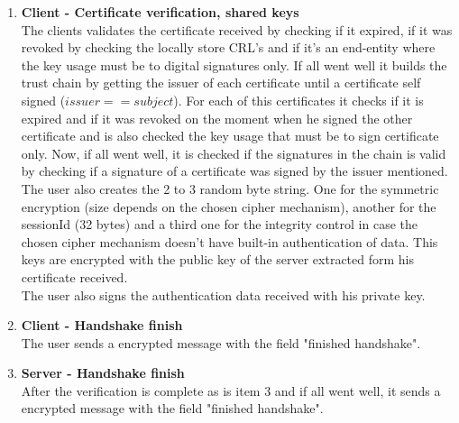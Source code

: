 \documentclass[12pt]{article}
\begin{document}
\begin{enumerate}[label=\textbf{\arabic*}]
  \item \textbf{Client - Certificate verification, shared keys} \\
    The clients validates the certificate received by checking if it expired, if it was
      revoked by checking the locally store CRL's and if it's an end-entity where the key usage must 
      be to digital signatures only. If all went well it builds the trust chain by getting the issuer 
      of each certificate until a certificate self signed (\(issuer == subject \)). For each of this 
      certificates it checks if it is expired and if it was revoked on the moment when he signed the 
      other certificate and is also checked the key usage that must be to sign certificate only. Now, 
      if all went well, it is checked if the signatures in the chain is valid by checking if a signature
      of a certificate was signed by the issuer mentioned. \\ 
    The user also creates the 2 to 3 random byte string. One for the symmetric encryption (size depends 
      on the chosen cipher mechanism), another for the sessionId (32 bytes) and a third one for the
      integrity control in case the chosen cipher mechanism doesn't have built-in authentication of data. 
      This keys are encrypted with the public key of the server extracted form his certificate received. \\
    The user also signs the authentication data received with his private key.

  \item \textbf{Client - Handshake finish} \\
    The user sends a encrypted message with the field "finished handshake".

  \item \textbf{Server - Handshake finish} \\
    After the verification is complete as is item 3 and if all went well, it sends a encrypted message with the field 
      "finished handshake".
\end{enumerate}
\end{document}
